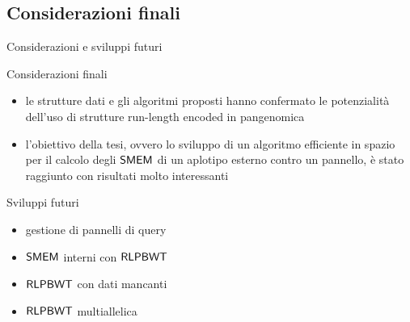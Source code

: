 \documentclass[]{beamer}
\def\KSMEM{\mbox{\rm {\sf K-SMEM}}}
\def\RLPBWT{\mbox{\rm {\sf RLPBWT}}}
\def\SMEM{\mbox{\rm {\sf SMEM}}}
\begin{document}
\subsection{Considerazioni finali}
\begin{frame}{Considerazioni e sviluppi futuri}
  \begin{block}{Considerazioni finali}
    \small
    \begin{itemize}
      \item le strutture dati e gli algoritmi proposti hanno
      confermato le potenzialità dell'uso di strutture run-length encoded in
      pangenomica
      \item l'obiettivo della tesi, ovvero lo sviluppo di un algoritmo
      efficiente in spazio per il calcolo degli $\SMEM$ di un aplotipo esterno
      contro un pannello, è stato raggiunto con risultati molto interessanti
    \end{itemize}
  \end{block}
  \begin{block}{Sviluppi futuri}
    \small
    \begin{multicols}{2}
      \begin{itemize}
        \item gestione di pannelli di query
        \item $\SMEM$ interni con $\RLPBWT$
        \item $\RLPBWT$ con dati mancanti
        \item $\RLPBWT$ multiallelica
      \end{itemize}
    \end{multicols}
  \end{block}
\end{frame}
\end{document}
